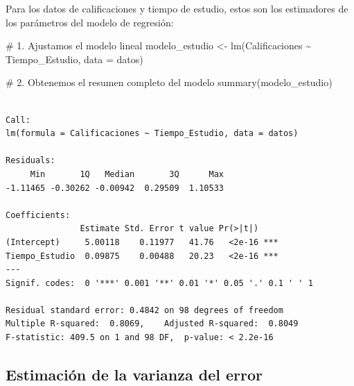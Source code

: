 \documentclass[
  letterpaper,
  DIV=11,
  numbers=noendperiod]{scrreprt}
\newenvironment{Shaded}{\begin{snugshade}}{\end{snugshade}}
\newcommand{\AttributeTok}[1]{\textcolor[rgb]{0.40,0.45,0.13}{#1}}
\newcommand{\CommentTok}[1]{\textcolor[rgb]{0.37,0.37,0.37}{#1}}
\newcommand{\FunctionTok}[1]{\textcolor[rgb]{0.28,0.35,0.67}{#1}}
\newcommand{\NormalTok}[1]{\textcolor[rgb]{0.00,0.23,0.31}{#1}}
\newcommand{\OtherTok}[1]{\textcolor[rgb]{0.00,0.23,0.31}{#1}}
\newcommand{\SpecialCharTok}[1]{\textcolor[rgb]{0.37,0.37,0.37}{#1}}
\begin{document}
\begin{tcolorbox}[enhanced jigsaw, leftrule=.75mm, breakable, colbacktitle=quarto-callout-tip-color!10!white, bottomrule=.15mm, colframe=quarto-callout-tip-color-frame, toprule=.15mm, colback=white, coltitle=black, bottomtitle=1mm, left=2mm, title=\textcolor{quarto-callout-tip-color}{\faLightbulb}\hspace{0.5em}{Ejemplo}, opacityback=0, arc=.35mm, opacitybacktitle=0.6, toptitle=1mm, titlerule=0mm, rightrule=.15mm]

Para los datos de calificaciones y tiempo de estudio, estos son los
estimadores de los parámetros del modelo de regresión:

\begin{Shaded}
\begin{Highlighting}[]
\CommentTok{\# 1. Ajustamos el modelo lineal}
\NormalTok{modelo\_estudio }\OtherTok{\textless{}{-}} \FunctionTok{lm}\NormalTok{(Calificaciones }\SpecialCharTok{\textasciitilde{}}\NormalTok{ Tiempo\_Estudio, }\AttributeTok{data =}\NormalTok{ datos)}

\CommentTok{\# 2. Obtenemos el resumen completo del modelo}
\FunctionTok{summary}\NormalTok{(modelo\_estudio)}
\end{Highlighting}
\end{Shaded}

\begin{verbatim}

Call:
lm(formula = Calificaciones ~ Tiempo_Estudio, data = datos)

Residuals:
     Min       1Q   Median       3Q      Max 
-1.11465 -0.30262 -0.00942  0.29509  1.10533 

Coefficients:
               Estimate Std. Error t value Pr(>|t|)    
(Intercept)     5.00118    0.11977   41.76   <2e-16 ***
Tiempo_Estudio  0.09875    0.00488   20.23   <2e-16 ***
---
Signif. codes:  0 '***' 0.001 '**' 0.01 '*' 0.05 '.' 0.1 ' ' 1

Residual standard error: 0.4842 on 98 degrees of freedom
Multiple R-squared:  0.8069,    Adjusted R-squared:  0.8049 
F-statistic: 409.5 on 1 and 98 DF,  p-value: < 2.2e-16
\end{verbatim}

\end{tcolorbox}

\subsection{Estimación de la varianza del
error}\label{estimaciuxf3n-de-la-varianza-del-error}
\end{document}

